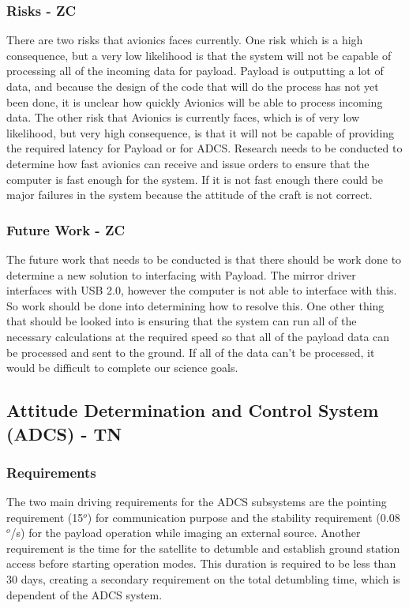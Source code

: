 \documentclass[12pt]{article}
\begin{document}
			\subsubsection{Risks - ZC}
There are two risks that avionics faces currently. One risk which is a high consequence, but a very low likelihood is that the system will not be capable of processing all of the incoming data for payload. Payload is outputting a lot of data, and because the design of the code that will do the process has not yet been done, it is unclear how quickly Avionics will be able to process incoming data. The other risk that Avionics is currently faces, which is of very low likelihood, but very high consequence, is that it will not be capable of providing the required latency for Payload or for ADCS. Research needs to be conducted to determine how fast avionics can receive and issue orders to ensure that the computer is fast enough for the system. If it is not fast enough there could be major failures in the system because the attitude of the craft is not correct.

			\subsubsection{Future Work - ZC}
The future work that needs to be conducted is that there should be work done to determine a new solution to interfacing with Payload. The mirror driver interfaces with USB 2.0, however the computer is not able to interface with this. So work should be done into determining how to resolve this. One other thing that should be looked into is ensuring that the system can run all of the necessary calculations at the required speed so that all of the payload data can be processed and sent to the ground. If all of the data can’t be processed, it would be difficult to complete our science goals.



		\subsection{Attitude Determination and Control System (ADCS) - TN} 
			\subsubsection{Requirements}
		
				The two main driving requirements for the ADCS subsystems are the 			pointing requirement (15$^o$) for communication purpose and the stability requirement (0.08$^o$/s) for the payload operation while imaging an external source. Another requirement is the time for the satellite to detumble and establish ground station access before starting operation modes. This duration is required to be less than 30 days, creating a secondary requirement on the total detumbling time, which is dependent of the ADCS system. 
\end{document}
